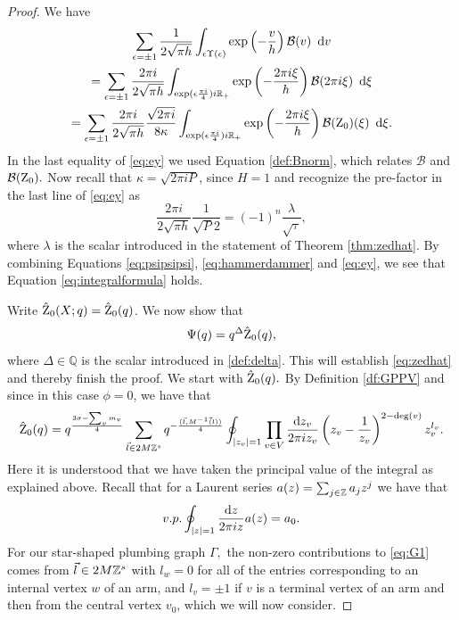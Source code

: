 \begin{proof}
  We have 
  	\begin{multline} \label{eq:ey}
  	\sum_{\epsilon=\pm 1 } \frac{1}{2\sqrt{\pi h}}\int_{\epsilon \Upsilon(\epsilon)} \exp\left(-\frac{v}{h}\right) \mathcal{B}(v) \ \operatorname{{d}\hskip-.6mm} v
  	\\= \sum_{\epsilon=\pm 1 } \frac{2\pi i }{2\sqrt{\pi h}}\int_{\exp(\epsilon \frac{\pi i}{4})i\mathbb{R}_+}  \exp\left(-\frac{2\pi i \xi}{h}\right) \mathcal{B}(2 \pi i \xi) \ \operatorname{{d}\hskip-.6mm} \xi
  	\\ = \sum_{\epsilon=\pm 1 } \frac{2\pi i }{2\sqrt{\pi h}} \frac{\sqrt{2\pi i}}{8\kappa} \int_{\exp(\epsilon \frac{\pi i}{4})i\mathbb{R}_+}  \exp\left(-\frac{2\pi i \xi}{h}\right)\mathcal{B}(\operatorname{Z}_{0})(\xi) \ \operatorname{{d}\hskip-.6mm} \xi.
  	\end{multline}
  	In the last equality of  \eqref{eq:ey} we used Equation \eqref{def:Bnorm}, which relates $\mathcal{B}$ and $\mathcal{B}(\operatorname{Z}_0).$ Now recall that $\kappa=\sqrt{2\pi i P}$, since $H=1$ and recognize the pre-factor in the last line of \eqref{eq:ey} as
  	\begin{equation}
  	\frac{2\pi i }{2\sqrt{\pi h}} \frac{1}{\sqrt{P}2} =(-1)^n\frac{\lambda}{\sqrt{\tau}},
  	\end{equation}
  	where $\lambda$ is the scalar introduced in the statement of Theorem \ref{thm:zedhat}. By combining
  	Equations \eqref{eq:psipsipsi}, \eqref{eq:hammerdammer} and \eqref{eq:ey}, we see that Equation \eqref{eq:integralformula} holds. 
  	
  	Write $\hat{\operatorname{Z}}_0(X;q) =\hat{\operatorname{Z}}_0(q)$. We now  show that 
  	\begin{equation} \label{eq:numerodos}
  	\Psi(q)=q^{\Delta}\hat{\operatorname{Z}}_0(q),
  	\end{equation}
  	where $\Delta \in \mathbb{Q}$ is the scalar introduced in \eqref{def:delta}. This will establish \eqref{eq:zedhat} and thereby finish the proof. We start with $\hat{\operatorname{Z}}_0(q).$ By Definition \ref{df:GPPV} and since in this case $\phi =0$, we have that
  	\begin{equation} \label{eq:G1}
  	\hat{\operatorname{Z}}_0(q)=q^{\frac{3\sigma-\sum_v m_v}{4}}\sum_{\vec{l}\in 2M\mathbb{Z}^s}
  	q^{-\frac{(\vec{l},M^{-1}\vec(l))}{4}}  \oint_{\lvert z_v \rvert=1} \prod_{v\in V} \frac{\operatorname{{d}\hskip-.6mm} z_v}{2\pi iz_v}\left(z_v-\frac{1}{z_v}\right)^{2-\text{deg}(v)} z_v^{l_v}.
  	\end{equation}
  	Here it is understood that we have taken the principal value of the integral as explained above. Recall that for a Laurent series $a(z)=\sum_{j \in \mathbb{Z}} a_jz^j$ we have that
  	$$v.p. \oint_{\lvert z \rvert =1} \frac{\operatorname{{d}\hskip-.6mm} z}{2\pi i z} a(z)=a_0.$$
  	For our star-shaped plumbing graph $\Gamma,$ the  non-zero  contributions to  \eqref{eq:G1} comes from 
  	$\vec{l}\in 2M\mathbb{Z}^s$ with
  	$l_w=0$ for all of the entries corresponding to an  internal vertex $w$ of an arm, and $l_v=\pm 1$ if $v$ is a terminal vertex of an arm and then from the central vertex $v_0$, which we will now consider. 
  	

\end{proof}
